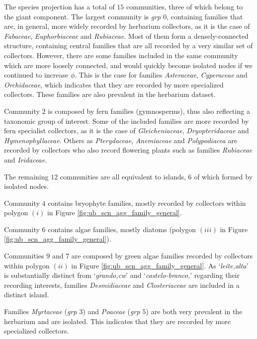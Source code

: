 The species projection has a total of $15$ communities, three of which belong to the giant component. 
%
The largest community is \textit{grp $0$}, containing families that are, in general, more widely recorded by herbarium collectors, as it is the case of \textit{Fabaceae}, \textit{Euphorbiaceae} and \textit{Rubiaceae}.
Most of them form a densely-connected structure, containing central families that are all recorded by a very similar set of collectors.
However, there are some families included in the same community which are more loosely connected, and would quickly become isolated nodes if we continued to increase $\phi$. 
This is the case for families \textit{Asteraceae}, \textit{Cyperaceae} and \textit{Orchidaceae}, which indicates that they are recorded by more specialized collectors.
These families are also prevalent in the herbarium dataset.

Community $2$ is composed by fern families (gymnosperms), thus also reflecting a taxonomic group of interest.
Some of the included families are more recorded by fern specialist collectors, as it is the case of \textit{Gleicheniaceae}, \textit{Dryopteridaceae} and \textit{Hymenophyllaceae}.
Others as \textit{Pterydaceae}, \textit{Anemiaceae} and \textit{Polypodiacea} are recorded by collectors who also record flowering plants such as families \textit{Rubiaceae} and \textit{Iridaceae}.


The remaining $12$ communities are all equivalent to islands, $6$ of which formed by isolated nodes.

Community $4$ contains bryophyte families, mostly recorded by collectors within polygon $(i)$ in Figure \ref{fig:ub_scn_agg_family_general}.

Community $6$ contains algae families, mostly diatoms (polygon $(iii)$ in Figure \ref{fig:ub_scn_agg_family_general}).

Communities $9$ and $7$ are composed by green algae families recorded by collectors within polygon $(ii)$ in Figure \ref{fig:ub_scn_agg_family_general}.
As `\textit{leite,alta}' is substantially distinct from `\textit{grando,cw}' and `\textit{castelo-branco,}' regarding their recording interests, families \textit{Desmidiaceae} and \textit{Closteriaceae} are included in a distinct island.

Families \textit{Myrtaceae} (\textit{grp $3$}) and \textit{Poaceae} (\textit{grp $5$}) are both very prevalent in the herbarium and are isolated.
This indicates that they are recorded by more specialized collectors.




